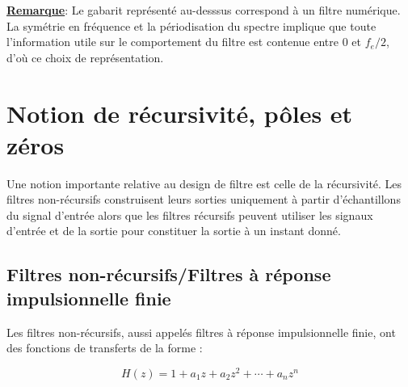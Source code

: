 \documentclass[11pt,a4paper]{article}
\begin{document}
\underline{\textbf{Remarque}}: Le gabarit représenté au-desssus correspond à un filtre numérique. La symétrie en fréquence et la périodisation du spectre implique que toute l'information utile sur le comportement du filtre est contenue entre 0 et $f_e/2$, d'où ce choix de représentation.

\section{Notion de récursivité, pôles et zéros}
Une notion importante relative au design de filtre est celle de la récursivité. Les filtres non-récursifs construisent leurs sorties uniquement à partir d'échantillons du signal d'entrée alors que les filtres récursifs peuvent utiliser les signaux d'entrée et de la sortie pour constituer la sortie à un instant donné.\\
\begin{center}
\end{center}

\subsection{Filtres non-récursifs/Filtres à réponse impulsionnelle finie}
Les filtres non-récursifs, aussi appelés filtres à réponse impulsionnelle finie, ont des fonctions de transferts de la forme :

\[ H(z) = 1+ a_1 z + a_2 z^2 + \cdots + a_n z^n  \] \\
\end{document}
